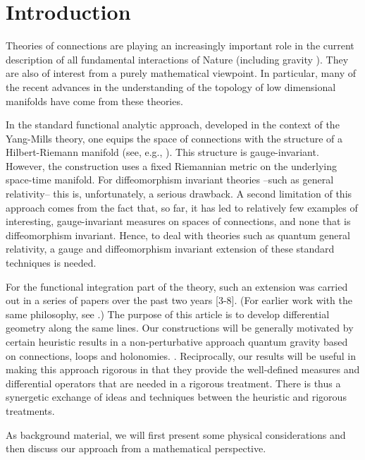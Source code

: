 \goodbreak

\section{Introduction}

Theories of connections are playing an increasingly important role in
the current description of all fundamental interactions of Nature
(including gravity \cite{AA1}). They are also of interest from a
purely mathematical viewpoint. In particular, many of the recent
advances in the understanding of the topology of low dimensional
manifolds have come from these theories.

In the standard functional analytic approach, developed in the context
of the Yang-Mills theory, one equips the space of connections with the
structure of a Hilbert-Riemann manifold (see, e.g., \cite{AM}). This
structure is gauge-invariant. However, the construction uses a fixed
Riemannian metric on the underlying space-time manifold.  For
diffeomorphism invariant theories --such as general relativity-- this
is, unfortunately, a serious drawback. A second limitation of this
approach comes from the fact that, so far, it has led to relatively
few examples of interesting, gauge-invariant measures on spaces of
connections, and none that is diffeomorphism invariant. Hence, to deal
with theories such as quantum general relativity, a gauge and
diffeomorphism invariant extension of these standard techniques is
needed.

For the functional integration part of the theory, such an extension
was carried out in a series of papers over the past two years [3-8].
(For earlier work with the same philosophy, see \cite{KK}.)  The
purpose of this article is to develop differential geometry along the
same lines.  Our constructions will be generally motivated by certain
heuristic results in a non-perturbative approach quantum gravity based
on connections, loops and holonomies. \cite{AA3, RS}. Reciprocally,
our results will be useful in making this approach rigorous
\cite{ALMMT2, AA2} in that they provide the well-defined measures and 
differential operators that are needed in a rigorous treatment.  There
is thus a synergetic exchange of ideas and techniques between the
heuristic and rigorous treatments.

As background material, we will first present some physical
considerations and then discuss our approach from a mathematical
perspective.

